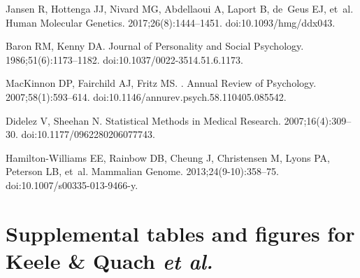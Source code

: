 \documentclass[10pt,letterpaper,twoside]{article}
\begin{document}
\newpage

\begin{thebibliography}{10}

Jansen R, Hottenga JJ, Nivard MG, Abdellaoui A, Laport B, de~Geus EJ, et~al.
\newblock Human Molecular Genetics. 2017;26(8):1444--1451.
\newblock doi:{10.1093/hmg/ddx043}.

Baron RM, Kenny DA.
\newblock Journal of Personality and Social Psychology. 1986;51(6):1173--1182.
\newblock doi:{10.1037/0022-3514.51.6.1173}.

MacKinnon DP, Fairchild AJ, Fritz MS.
.
\newblock Annual Review of Psychology. 2007;58(1):593--614.
\newblock doi:{10.1146/annurev.psych.58.110405.085542}.

Didelez V, Sheehan N.
\newblock Statistical Methods in Medical Research. 2007;16(4):309--30.
\newblock doi:{10.1177/0962280206077743}.

Hamilton-Williams EE, Rainbow DB, Cheung J, Christensen M, Lyons PA, Peterson
  LB, et~al.
\newblock Mammalian Genome. 2013;24(9-10):358--75.
\newblock doi:{10.1007/s00335-013-9466-y}.

\end{thebibliography}

\newpage

\section*{Supplemental tables and figures for Keele \& Quach \textit{et al.}}

\setcounter{table}{0}
\setcounter{figure}{0}
\renewcommand{\thetable}{S\arabic{table}}
\renewcommand{\thefigure}{S\arabic{figure}}
\setcounter{page}{1}
\end{document}
